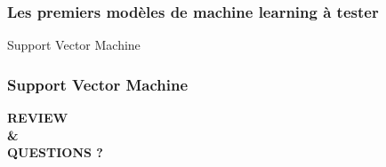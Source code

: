 \documentclass{formation}
\begin{document}
\begin{frame}
  \frametitle{Les premiers modèles de machine learning à tester}
  \begin{minipage}[l]{0.49\linewidth}
    \begin{center}
      Support Vector Machine
    \end{center}
  \end{minipage}\hfill
  \begin{minipage}[l]{0.49\linewidth}
  \end{minipage}\hfill
\end{frame}

\begin{frame}
  \frametitle{Support Vector Machine}
  \begin{center}
   \textbf{REVIEW \\ \& \\ QUESTIONS ?}
  \end{center}
\end{frame}
\end{document}
